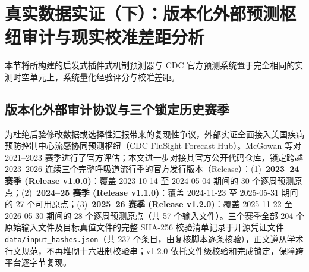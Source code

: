 \documentclass[11pt,a4paper]{article}
\theoremstyle{plain}
\theoremstyle{definition}
\begin{document}
\begin{table}[htbp]
\centering
\footnotesize
\caption{各阶段州级中位机制视界的联合自助 95\% 区间（$B=1000$，同时传播辖区抽样变异与增长乘子估计误差）}
\label{tab:joint_ci}

\end{table}

\section{真实数据实证（下）：版本化外部预测枢纽审计与现实校准差距分析}\label{sec:hub_audit}

本节将所构建的启发式插件式机制预测器与 CDC 官方预测系统置于完全相同的实测时空单元上，系统量化经验评分与校准差距。

\subsection{版本化外部审计协议与三个锁定历史赛季}\label{sec:flusight_protocol}

为杜绝后验修改数据或选择性汇报带来的复现性争议，外部实证全面接入美国疾病预防控制中心流感协同预测枢纽（CDC FluSight Forecast Hub）\citep{flusight2024evaluation, flusight_repo}。McGowan 等\citep{flusight2024evaluation}对 2021--2023 赛季进行了官方评估；本文进一步对接其官方公开代码仓库\citep{flusight_repo}，锁定跨越 2023--2026 连续三个完整呼吸道流行季的官方发行版本（Release）：(1)~\textbf{2023--24 赛季 (Release v1.0.0)}：覆盖 2023-10-14 至 2024-05-04 期间的 30 个逐周预测原点；(2)~\textbf{2024--25 赛季 (Release v1.1.0)}：覆盖 2024-11-23 至 2025-05-31 期间的 27 个可用原点；(3)~\textbf{2025--26 赛季 (Release v1.2.0)}：覆盖 2025-11-22 至 2026-05-30 期间的 28 个逐周预测原点（共 57 个输入文件）。三个赛季全部 204 个原始输入文件及目标真值文件的完整 SHA-256 校验清单记录于开源凭证文件 \texttt{data/input\_hashes.json}（共 237 个条目，由复核脚本逐条核验），正文遵从学术行文规范，不再堆砌十六进制校验串；v1.2.0 依托文件级校验和完成锁定，保障跨平台逐字节复现。
\end{document}
